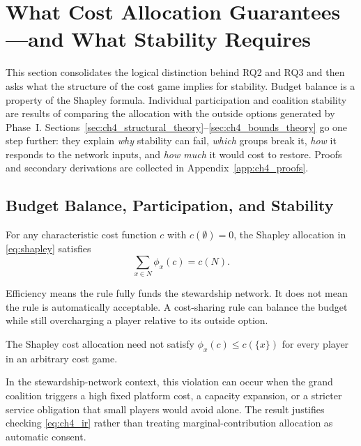 \section{What Cost Allocation Guarantees---and What Stability Requires}
\label{sec:properties}

This section consolidates the logical distinction behind RQ2 and RQ3 and then asks what the structure of the cost game implies for stability. Budget balance is a property of the Shapley formula. Individual participation and coalition stability are results of comparing the allocation with the outside options generated by Phase~I. Sections~\ref{sec:ch4_structural_theory}--\ref{sec:ch4_bounds_theory} go one step further: they explain \emph{why} stability can fail, \emph{which} groups break it, \emph{how} it responds to the network inputs, and \emph{how much} it would cost to restore. Proofs and secondary derivations are collected in Appendix~\ref{app:ch4_proofs}.

\subsection{Budget Balance, Participation, and Stability}
\label{sec:ch4_guarantees}

\begin{proposition}
\label{prop:ch4_efficiency}
For any characteristic cost function $c$ with $c(\emptyset)=0$, the Shapley allocation in \eqref{eq:shapley} satisfies
\begin{equation}
\label{eq:ch4_shapley_efficiency}
\sum_{x\in N}\phi_x(c)=c(N).
\end{equation}
\end{proposition}

Efficiency means the rule fully funds the stewardship network. It does not mean the rule is automatically acceptable. A cost-sharing rule can balance the budget while still overcharging a player relative to its outside option.

\begin{proposition}
\label{prop:ch4_ir_not_automatic}
The Shapley cost allocation need not satisfy $\phi_x(c)\leq c(\{x\})$ for every player in an arbitrary cost game.
\end{proposition}

In the stewardship-network context, this violation can occur when the grand coalition triggers a high fixed platform cost, a capacity expansion, or a stricter service obligation that small players would avoid alone. The result justifies checking \eqref{eq:ch4_ir} rather than treating marginal-contribution allocation as automatic consent.

